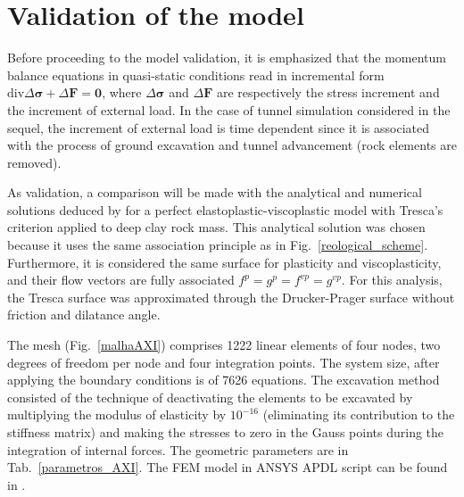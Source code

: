 \documentclass[Journal,letterpaper]{ascelike-new}
\newcommand{\Fl}{\boldsymbol{F}}
\newcommand{\stress}{\boldsymbol{\sigma}}
\newcommand{\zerol}{\boldsymbol 0}
\begin{document}
\section{Validation of the model}

Before proceeding to the model validation, it is emphasized that the momentum balance equations in quasi-static conditions read in incremental form $\text{div}\Delta \stress + \Delta \Fl = \zerol$, where $\Delta \stress$ and $\Delta \Fl$ are respectively the stress increment and the increment of external load. In the case of tunnel simulation considered in the sequel, the increment of external load is time dependent since it is associated with the process of ground excavation and tunnel advancement (rock elements are removed).

As validation, a comparison will be made with the analytical and numerical solutions deduced by \cite{piepi1995} for a perfect elastoplastic-viscoplastic model with Tresca’s criterion applied to deep clay rock mass. This analytical solution was chosen because it uses the same association principle as in Fig.~\ref{reological_scheme}. Furthermore, it is considered the same surface for plasticity and viscoplasticity, and their flow vectors are fully associated  $f^p = g^{p} = f^{vp} = g^{vp}$. For this analysis, the Tresca surface was approximated through the Drucker-Prager surface without friction and dilatance angle.

The mesh (Fig.~\ref{malhaAXI}) comprises 1222 linear elements of four nodes, two degrees of freedom per node and four integration points. The system size, after applying the boundary conditions is of 7626 equations. The excavation method consisted of the technique of deactivating the elements to be excavated by multiplying the modulus of elasticity by $10^{-16}$ (eliminating its contribution to the stiffness matrix) and making the stresses to zero in the Gauss points during the integration of internal forces. The geometric parameters are in Tab.~\ref{parametros_AXI}. The FEM model in ANSYS APDL script can be found in .
\end{document}
